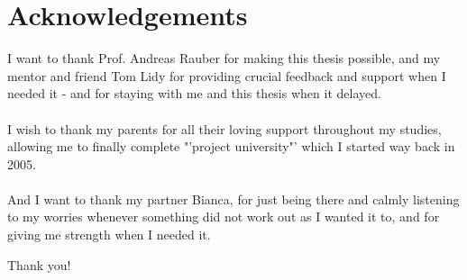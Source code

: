\chapter*{Acknowledgements}

I want to thank Prof. Andreas Rauber for making this thesis possible, and my mentor and friend Tom Lidy for providing crucial feedback and support when I needed it - and for staying with me and this thesis when it delayed.
\\\\
I wish to thank my parents for all their loving support throughout my studies, allowing me to finally complete "'project university"' which I started way back in 2005.
\\\\
And I want to thank my partner Bianca, for just being there and calmly listening to my worries whenever something did not work out as I wanted it to, and for giving me strength when I needed it.

Thank you!